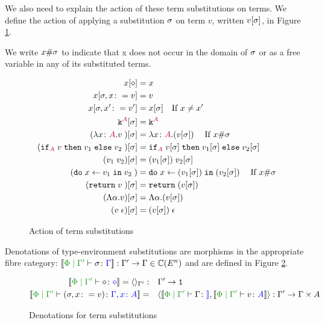 \documentclass{Report}
\begin{document}
We also need to explain the action of these term substitutions on terms. We define the action of applying a substitution $\sigma$  on term $v$, written $v[\sigma]$, in Figure \ref{TermSubstitutionAction}. 


\begin{framed}
    \begin{definition}[Freshness]
        We write $x\#\sigma$ to indicate that x does not occur in the domain of $\sigma$ or as a free variable in any of its substituted terms.
    \end{definition}
\end{framed}

\begin{figure}[H]
    \centering
    \begin{align*}
        x[\diamond] & = x \\
        x[\sigma,x\colon= v] & = v \\
        x[\sigma,x'\colon= v'] & = x[\sigma]\quad\text{If }x \neq x'\\
        \texttt{k}^{\color{purple} A}[\sigma] & = \texttt{k}^{\color{purple} A} \\
        (\lambda x \colon {\color{purple}A}. v\;)[\sigma] &= \lambda x \colon {\color{purple}A}. (v[\sigma])\;\quad\text{If }x\#\sigma\\
        (\texttt{if}_{\textcolor{purple}{A}}\; v\; \texttt{then}\; v_1 \;\texttt{else} \; v_2\;)[\sigma] &= \texttt{if}_{\textcolor{purple}{A}}\; v[\sigma]\; \texttt{then}\; v_1[\sigma] \;\texttt{else} \; v_2[\sigma]\;\\
        (v_1\; v_2)[\sigma]&= (v_1[\sigma])\; v_2[\sigma]\\
        (\texttt{do}\; x \leftarrow v_1 \;\texttt{in}\; v_2\;)&= \texttt{do}\; x \leftarrow (v_1[\sigma]) \;\texttt{in}\; (v_2[\sigma])\;\quad\text{If } x\#\sigma\\
        (\texttt{return} \; v\;)[\sigma] & = \texttt{return} \;(v[\sigma])\; \\
        (\Lambda \alpha. v)[\sigma] & = \Lambda \alpha. (v[\sigma])\\
        (v\;\epsilon)[\sigma] & = (v[\sigma])\;\epsilon\\
    \end{align*}
    
    \caption{Action of term substitutions}
    \label{TermSubstitutionAction}
\end{figure}


Denotations of type-environment substitutions are morphisms in the appropriate fibre category: $\deno{\etyperelation{\P}{\G'}{\si}{\G}}: \G' \rightarrow \G \in \C(E^n)$ and are defined in Figure \ref{TermSubstitutionDenotations}.

\begin{figure}[H]
    \centering
    \begin{framed}
\begin{align*}
    \deno{\etyperelation{\P}{\G'}{\nil}{\nil}} = \term{\G'}:&\quad \G' \rightarrow \1
    \\
    \deno{\etyperelation{\P}{\G'}{(\si, x \setto v)}{\gax}} =&\quad \pr{\deno{\etyperelation{\P}{\G'}{\G}}}{\deno{\etyperelation{\P}{\G'}{v}{A}}}: \G' \rightarrow \G\times A
\end{align*}
    \end{framed}
    \caption{Denotations for term substitutions}
    \label{TermSubstitutionDenotations}
\end{figure}
\end{document}

